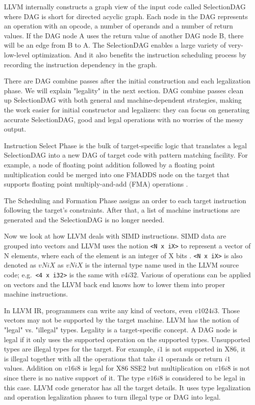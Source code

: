 LLVM internally constructs a graph view of the input code called SelectionDAG where DAG is short for directed acyclic graph. Each node in the DAG represents an operation with an opcode, a number of operands and a number of return values. If the DAG node A uses the return value of another DAG node B, there will be an edge from B to A. The SelectionDAG enables a large variety of very-low-level optimization. And it also benefits the instruction scheduling process by recording the instruction dependency in the graph.

There are DAG combine passes after the initial construction and each legalization phase\cite{llvm_code_gen}. We will explain "legality" in the next section. DAG combine passes clean up SelectionDAG with both general and machine-dependent strategies, making the work easier for initial constructor and legalizers: they can focus on generating accurate SelectionDAG, good and legal operations with no worries of the messy output.

Instruction Select Phase is the bulk of target-specific logic that translates a legal SelectionDAG into a new DAG of target code with pattern matching facility. For example, a node of floating point addition followed by a floating point multiplication could be merged into one FMADDS node on the target that supports floating point multiply-and-add (FMA) operations \cite{llvm_code_gen}.

The Scheduling and Formation Phase assigns an order to each target instruction following the target's constraints. After that, a list of machine instructions are generated and the SelectionDAG is no longer needed.

Now we look at how LLVM deals with SIMD instructions. SIMD data are grouped into vectors and LLVM uses the notion \verb|<N x iX>| to represent a vector of N elements, where each of the element is an integer of X bits \cite{llvm_lang_ref, hybrid_simd_type_legalize}. \verb|<N x iX>| is also denoted as $vNiX$ as $vNiX$ is the internal type name used in the LLVM source code; e.g.\ \verb|<4 x i32>| is the same with $v4i32$. Various of operations can be applied on vectors and the LLVM back end knows how to lower them into proper machine instructions.

In LLVM IR, programmers can write any kind of vectors, even $v1024i3$. Those vectors may not be supported by the target machine. LLVM has the notion of "legal" vs. "illegal" types. Legality is a target-specific concept. A DAG node is legal if it only uses the supported operation on the supported types. Unsupported types are illegal types for the target. For example, $i1$ is not supported in X86, it is illegal together with all the operations that take $i1$ operands or return $i1$ values. Addition on $v16i8$ is legal for X86 SSE2 but multiplication on $v16i8$ is not since there is no native support of it. The type $v16i8$ is considered to be legal in this case. LLVM code generator has all the target details. It uses type legalization and operation legalization phases to turn illegal type or DAG into legal\cite{llvm_code_gen}.

